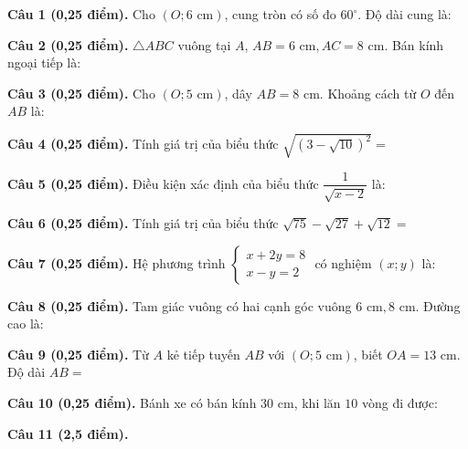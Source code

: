 \documentclass[12pt,a4paper]{article}
\begin{document}
\vspace{1.2mm}
\noindent\textbf{Câu 1 (0,25 điểm).} Cho $(O; 6\text{ cm})$, cung tròn có số đo $60^\circ$. Độ dài cung là: \par\vspace{0.8mm}
\noindent\textbf{Câu 2 (0,25 điểm).} $\triangle ABC$ vuông tại $A$, $AB = 6\text{ cm}, AC = 8\text{ cm}$. Bán kính ngoại tiếp là: \par\vspace{0.8mm}
\noindent\textbf{Câu 3 (0,25 điểm).} Cho $(O; 5\text{ cm})$, dây $AB = 8\text{ cm}$. Khoảng cách từ $O$ đến $AB$ là: \par\vspace{0.8mm}
\noindent\textbf{Câu 4 (0,25 điểm).} Tính giá trị của biểu thức $\sqrt{(3 - \sqrt{10})^2} = $ \par\vspace{0.8mm}
\noindent\textbf{Câu 5 (0,25 điểm).} Điều kiện xác định của biểu thức $\dfrac{1}{\sqrt{x - 2}}$ là: \par\vspace{0.8mm}
\noindent\textbf{Câu 6 (0,25 điểm).} Tính giá trị của biểu thức $\sqrt{75} - \sqrt{27} + \sqrt{12} = $ \par\vspace{0.8mm}
\noindent\textbf{Câu 7 (0,25 điểm).} Hệ phương trình $\begin{cases} x + 2y = 8 \\ x - y = 2 \end{cases}$ có nghiệm $(x; y)$ là: \par\vspace{0.8mm}
\noindent\textbf{Câu 8 (0,25 điểm).} Tam giác vuông có hai cạnh góc vuông $6\text{ cm}, 8\text{ cm}$. Đường cao là: \par\vspace{0.8mm}
\noindent\textbf{Câu 9 (0,25 điểm).} Từ $A$ kẻ tiếp tuyến $AB$ với $(O; 5\text{ cm})$, biết $OA = 13\text{ cm}$. Độ dài $AB = $ \par\vspace{0.8mm}
\noindent\textbf{Câu 10 (0,25 điểm).} Bánh xe có bán kính $30\text{ cm}$, khi lăn $10$ vòng đi được: \par\vspace{0.8mm}
\vspace{0.6mm}
\noindent\textbf{Câu 11 (2,5 điểm).}
\vspace{0.6mm}
\end{document}
